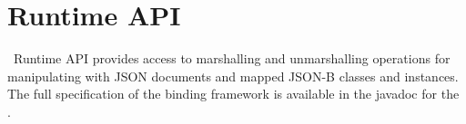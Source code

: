 \chapter{Runtime API}
\label{runtime}

\jsonb\ Runtime API provides access to marshalling and unmarshalling operations for manipulating with JSON documents and mapped JSON-B classes and instances. The full specification of the binding framework is available in the javadoc for the .
